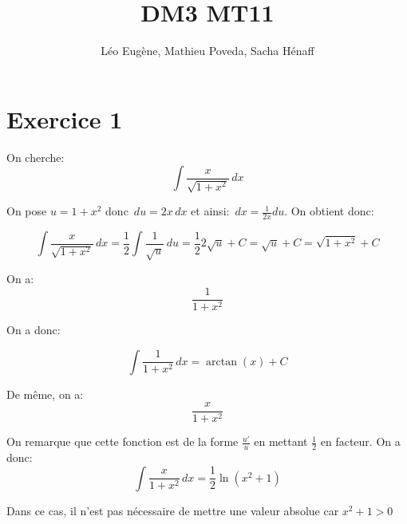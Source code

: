 \documentclass[12pt,a4paper, french]{article}
\title{DM3 MT11}
\author{Léo Eugène, Mathieu Poveda, Sacha Hénaff}
\date{}
\begin{document}
\maketitle

\section*{Exercice 1}
On cherche:
\begin{equation*}
    \int \frac{x}{\sqrt{1+x^2}}\,dx
\end{equation*}

On pose \begin{math}
    u=1+x^2
\end{math} donc \begin{math}
    \,du = 2x\,dx 
\end{math} et ainsi: \begin{math}
    \,dx=\frac{1}{2x}du
\end{math}. On obtient donc: 

\begin{equation*}
    \int \frac{x}{\sqrt{1+x^2}}\,dx=\frac{1}{2}\int \frac{1}{\sqrt{u}}\,du=\frac{1}{2}2\sqrt{u}+C=\sqrt{u}+C=\sqrt{1+x^2}+C
\end{equation*}

 On a:
 \begin{equation*}
    \frac{1}{1+x^2}
 \end{equation*}

On a donc:
\begin{center}
    \begin{equation*}
        \int \frac{1}{1+x^2}\,dx = \arctan(x)+C
    \end{equation*}
\end{center}

De même, on a: 
\begin{equation*}
    \frac{x}{1+x^2}
 \end{equation*}

On remarque que cette fonction est de la forme \begin{math}
    \frac{u'}{u}
\end{math} en mettant \begin{math}
    \frac{1}{2}
\end{math} en facteur. On a donc:
\begin{equation*}
    \int \frac{x}{1+x^2} \,dx= \frac{1}{2}\ln(x^2+1)
 \end{equation*}

 Dans ce cas, il n'est pas nécessaire de mettre une valeur absolue car \begin{math}
    x^2+1>0
 \end{math}
\end{document}
